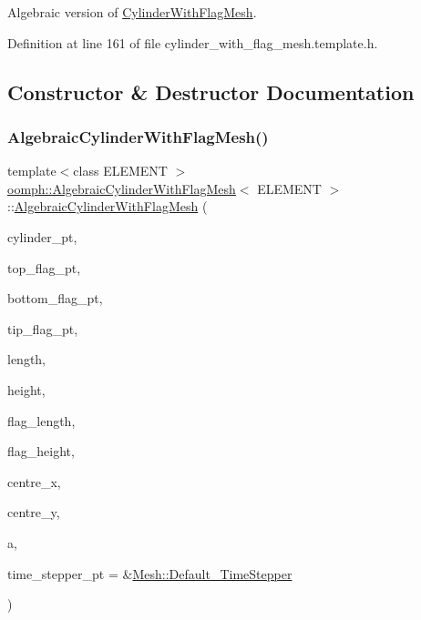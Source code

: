 Algebraic version of \hyperlink{classoomph_1_1CylinderWithFlagMesh}{Cylinder\+With\+Flag\+Mesh}. 

Definition at line 161 of file cylinder\+\_\+with\+\_\+flag\+\_\+mesh.\+template.\+h.



\subsection{Constructor \& Destructor Documentation}
\mbox{\label{classoomph_1_1AlgebraicCylinderWithFlagMesh_a2c307b804fee56aa620ea414b41883d5}} 
\subsubsection{\texorpdfstring{Algebraic\+Cylinder\+With\+Flag\+Mesh()}{AlgebraicCylinderWithFlagMesh()}}
{\footnotesize\ttfamily template$<$class E\+L\+E\+M\+E\+NT $>$ \\
\hyperlink{classoomph_1_1AlgebraicCylinderWithFlagMesh}{oomph\+::\+Algebraic\+Cylinder\+With\+Flag\+Mesh}$<$ E\+L\+E\+M\+E\+NT $>$\+::\hyperlink{classoomph_1_1AlgebraicCylinderWithFlagMesh}{Algebraic\+Cylinder\+With\+Flag\+Mesh} (\begin{DoxyParamCaption}\item[{\hyperlink{classoomph_1_1Circle}{Circle} $\ast$}]{cylinder\+\_\+pt,  }\item[{\hyperlink{classoomph_1_1GeomObject}{Geom\+Object} $\ast$}]{top\+\_\+flag\+\_\+pt,  }\item[{\hyperlink{classoomph_1_1GeomObject}{Geom\+Object} $\ast$}]{bottom\+\_\+flag\+\_\+pt,  }\item[{\hyperlink{classoomph_1_1GeomObject}{Geom\+Object} $\ast$}]{tip\+\_\+flag\+\_\+pt,  }\item[{const double \&}]{length,  }\item[{const double \&}]{height,  }\item[{const double \&}]{flag\+\_\+length,  }\item[{const double \&}]{flag\+\_\+height,  }\item[{const double \&}]{centre\+\_\+x,  }\item[{const double \&}]{centre\+\_\+y,  }\item[{const double \&}]{a,  }\item[{\hyperlink{classoomph_1_1TimeStepper}{Time\+Stepper} $\ast$}]{time\+\_\+stepper\+\_\+pt = {\ttfamily \&\hyperlink{classoomph_1_1Mesh_a12243d0fee2b1fcee729ee5a4777ea10}{Mesh\+::\+Default\+\_\+\+Time\+Stepper}} }\end{DoxyParamCaption})\hspace{0.3cm}{\ttfamily [inline]}}



